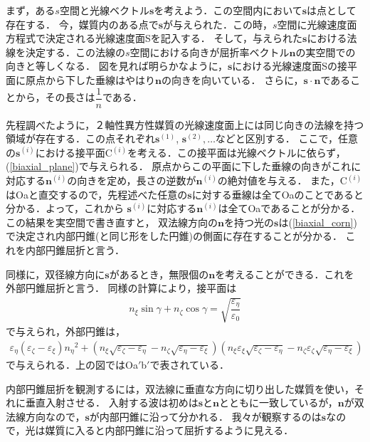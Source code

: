 まず，ある$s$空間と光線ベクトル$\boldsymbol{s}$を考えよう．この空間内において$\boldsymbol{s}$は点として存在する．
今，媒質内のある点で$\boldsymbol{s}$が与えられた．この時，$s$空間に光線速度面方程式で決定される光線速度面Sを記入する．
そして，与えられた$\boldsymbol{s}$における法線を決定する．この法線の$s$空間における向きが屈折率ベクトル$\boldsymbol{n}$の実空間での向きと等しくなる．
図を見れば明らかなように，$\boldsymbol{s}$における光線速度面Sの接平面に原点から下した垂線はやはり$\boldsymbol{n}$の向きを向いている．
さらに，$\boldsymbol{s}\cdot\boldsymbol{n}$であることから，その長さは$\dfrac{1}{n}$である．

先程調べたように，２軸性異方性媒質の光線速度面上には同じ向きの法線を持つ領域が存在する．この点それぞれ$\boldsymbol{s}^{(1)}$, $\boldsymbol{s}^{(2)},\ldots$などと区別する．
ここで，任意の$\boldsymbol{s}^{(i)}$における接平面C$^{(i)}$を考える．この接平面は光線ベクトルに依らず，(\ref{biaxial_plane})で与えられる．
原点からこの平面に下した垂線の向きがこれに対応する$\boldsymbol{n}^{(i)}$の向きを定め，長さの逆数が$\boldsymbol{n}^{(i)}$の絶対値を与える．
また，C$^{(i)}$はOaと直交するので，先程述べた任意の$\boldsymbol{s}$に対する垂線は全てOaのことであると分かる．よって，これから
$\boldsymbol{s}^{(i)}$に対応する$\boldsymbol{n}^{(i)}$は全てOaであることが分かる．
この結果を実空間で書き直すと，
双法線方向の$\boldsymbol{n}$を持つ光の$\boldsymbol{s}$は(\ref{biaxial_corn})で決定され内部円錐(と同じ形をした円錐)の側面に存在することが分かる．
これを内部円錐屈折と言う．

同様に，双径線方向に$\boldsymbol{s}$があるとき，無限個の$\boldsymbol{n}$を考えることができる．これを
外部円錐屈折と言う．
同様の計算により，接平面は
\begin{align}
  n_\xi\sin\gamma+n_\zeta\cos\gamma=\sqrt{\dfrac{\varepsilon_\eta}{\varepsilon_0}}
\end{align}
で与えられ，外部円錐は，
\begin{align}
  \varepsilon_\eta(\varepsilon_\zeta-\varepsilon_\xi){n_\eta}^2+\left(n_\xi\sqrt{\varepsilon_\zeta-\varepsilon_\eta}-n_\zeta\sqrt{\varepsilon_\eta-\varepsilon_\xi}\right)\left(n_\xi\varepsilon_\xi\sqrt{\varepsilon_\zeta-\varepsilon_\eta}-n_\zeta\varepsilon_\zeta\sqrt{\varepsilon_\eta-\varepsilon_\xi}\right)
\end{align}
で与えられる．上の図ではOa$'$b$'$で表されている．

内部円錐屈折を観測するには，双法線に垂直な方向に切り出した媒質を使い，それに垂直入射させる．
入射する波は初めは$\boldsymbol{s}$と$\boldsymbol{n}$とともに一致しているが，$\boldsymbol{n}$が双法線方向なので，$\boldsymbol{s}$が内部円錐に沿って分かれる．
我々が観察するのは$\boldsymbol{s}$なので，光は媒質に入ると内部円錐に沿って屈折するように見える．

